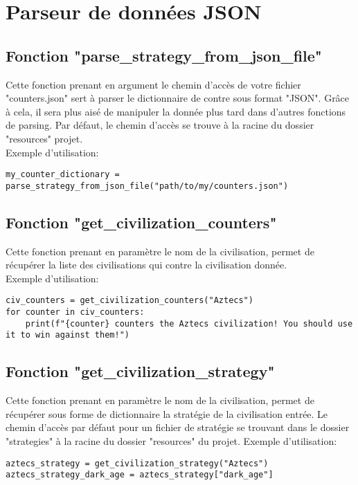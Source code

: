 
\section{Parseur de données JSON}
\subsection{Fonction "parse\_strategy\_from\_json\_file"}
Cette fonction prenant en argument le chemin d'accès de votre fichier "counters.json" sert à parser le dictionnaire de contre sous format "JSON". Grâce à cela, il sera plus aisé de manipuler la donnée plus tard dans d'autres fonctions de parsing. Par défaut, le chemin d'accès se trouve à la racine du dossier "resources" projet.\\
Exemple d'utilisation:

\begin{verbatim}
my_counter_dictionary = parse_strategy_from_json_file("path/to/my/counters.json")
\end{verbatim}

\subsection{Fonction "get\_civilization\_counters"}
Cette fonction prenant en paramètre le nom de la civilisation, permet de récupérer la liste des civilisations qui contre la civilisation donnée.\\
Exemple d'utilisation:
\begin{verbatim}
civ_counters = get_civilization_counters("Aztecs")
for counter in civ_counters:
    print(f"{counter} counters the Aztecs civilization! You should use it to win against them!")
\end{verbatim}

\subsection{Fonction "get\_civilization\_strategy"}
Cette fonction prenant en paramètre le nom de la civilisation, permet de récupérer sous forme de dictionnaire la stratégie de la civilisation entrée. Le chemin d'accès par défaut pour un fichier de stratégie se trouvant dans le dossier "strategies" à la racine du dossier "resources" du projet.
Exemple d'utilisation:
\begin{verbatim}
aztecs_strategy = get_civilization_strategy("Aztecs")
aztecs_strategy_dark_age = aztecs_strategy["dark_age"]
\end{verbatim}
